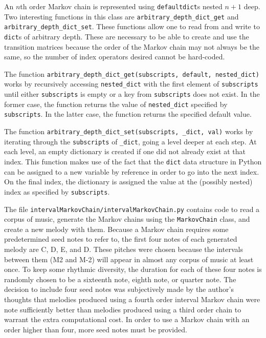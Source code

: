 An $n$th order Markov chain is represented using \texttt{defaultdict}s nested $n + 1$ deep.
Two interesting functions in this class are \texttt{arbitrary\_depth\_dict\_get} and \texttt{arbitrary\_depth\_dict\_set}.
These functions allow one to read from and write to \texttt{dict}s of arbitrary depth.
These are necessary to be able to create and use the transition matrices because the order of the Markov chain may not always be the same, so the number of index operators desired cannot be hard-coded.

The function \texttt{arbitrary\_depth\_dict\_get(subscripts, default, nested\_dict)} works by recursively accessing \texttt{nested\_dict} with the first element of \texttt{subscripts} until either \texttt{subscripts} is empty or a key from \texttt{subscripts} does not exist.
In the former case, the function returns the value of \texttt{nested\_dict} specified by \texttt{subscripts}.
In the latter case, the function returns the specified default value.

The function \texttt{arbitrary\_depth\_dict\_set(subscripts, \_dict, val)} works by iterating through the \texttt{subscripts} of \texttt{\_dict}, going a level deeper at each step.
At each level, an empty dictionary is created if one did not already exist at that index.
This function makes use of the fact that the \texttt{dict} data structure in Python can be assigned to a new variable by reference in order to go into the next index.
On the final index, the dictionary is assigned the value at the (possibly nested) index as specified by \texttt{subscripts}.

The file \texttt{intervalMarkovChain/intervalMarkovChain.py} contains code to read a corpus of music, generate the Markov chains using the \texttt{MarkovChain} class, and create a new melody with them.
Because a Markov chain requires some predetermined seed notes to refer to, the first four notes of each generated melody are C, D, E, and D.
These pitches were chosen because the intervals between them (M2 and M-2) will appear in almost any corpus of music at least once.
To keep some rhythmic diversity, the duration for each of these four notes is randomly chosen to be a sixteenth note, eighth note, or quarter note.
The decision to include four seed notes was subjectively made by the author's thoughts that melodies produced using a fourth order interval Markov chain were note sufficiently better than melodies produced using a third order chain to warrant the extra computational cost.
In order to use a Markov chain with an order higher than four, more seed notes must be provided.


